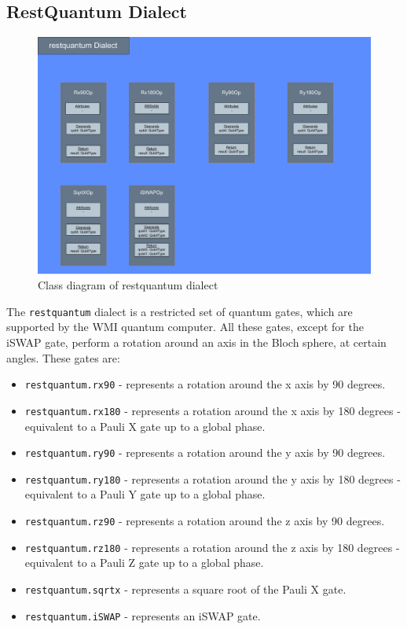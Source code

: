 \subsection{RestQuantum Dialect}
\begin{figure}
    \centering
    \includegraphics[width=\textwidth]{images/restquantum_dialect.pdf}
    \caption[Quantum Dialect]{Class diagram of restquantum dialect}
    \label {fig:restquantum_dialect}
\end{figure}
The \texttt{restquantum} dialect is a restricted set of quantum gates, which
are supported by the WMI quantum computer. All these gates, except for the iSWAP gate,
perform a rotation around an axis in the Bloch sphere, at certain angles.
These gates are:
\begin{itemize}
    \item \texttt{restquantum.rx90} - represents a rotation around the x axis by
          90 degrees.
    \item \texttt{restquantum.rx180} - represents a rotation around the x axis
          by 180 degrees - equivalent to a Pauli X gate up to a global phase.
    \item \texttt{restquantum.ry90} - represents a rotation around the y axis by
          90 degrees.
    \item \texttt{restquantum.ry180} - represents a rotation around the y axis
          by 180 degrees - equivalent to a Pauli Y gate up to a global phase.
    \item \texttt{restquantum.rz90} - represents a rotation around the z axis by
          90 degrees.
    \item \texttt{restquantum.rz180} - represents a rotation around the z axis
          by 180 degrees - equivalent to a Pauli Z gate up to a global phase.
    \item \texttt{restquantum.sqrtx} - represents a square root of the Pauli X
          gate.
    \item \texttt{restquantum.iSWAP} - represents an iSWAP gate.
\end{itemize}


